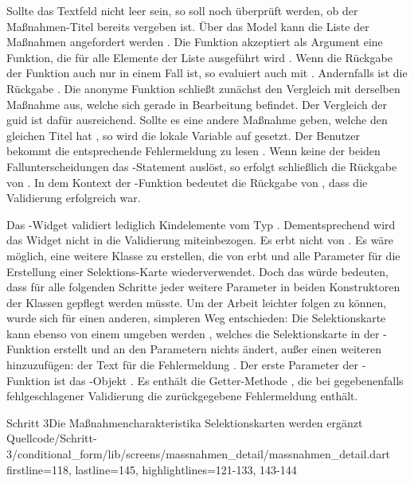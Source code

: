 Sollte das Textfeld nicht leer sein, so soll noch überprüft werden, ob der Maßnahmen-Titel bereits vergeben ist.
Über das Model kann die Liste der Maßnahmen angefordert werden .
Die Funktion  akzeptiert als Argument eine Funktion, die für alle Elemente der Liste ausgeführt wird .
Wenn die Rückgabe der Funktion auch nur in einem Fall  ist, so evaluiert auch  mit .
Andernfalls ist die Rückgabe . 
Die anonyme Funktion schließt zunächst den Vergleich mit derselben Maßnahme aus, welche sich gerade in Bearbeitung befindet.
Der Vergleich der guid ist dafür ausreichend.
Sollte es eine andere Maßnahme geben, welche den gleichen Titel hat , so wird die lokale Variable  auf  gesetzt.
Der Benutzer bekommt die entsprechende Fehlermeldung  zu lesen .
Wenn keine der beiden Fallunterscheidungen das -Statement  auslöst, so erfolgt schließlich die Rückgabe von .
In dem Kontext der -Funktion bedeutet die Rückgabe von  , dass die Validierung erfolgreich war.
 

 
Das -Widget validiert lediglich Kindelemente vom Typ .
Dementsprechend wird das Widget  nicht in die Validierung miteinbezogen.
Es erbt nicht von .
Es wäre möglich, eine weitere Klasse zu erstellen, die von  erbt und alle Parameter für die Erstellung einer Selektions-Karte wiederverwendet.
Doch das würde bedeuten, dass für alle folgenden Schritte jeder weitere Parameter in beiden Konstruktoren der Klassen gepflegt werden müsste.
Um der Arbeit leichter folgen zu können, wurde sich für einen anderen, simpleren Weg entschieden: 
Die Selektionskarte kann ebenso von einem  umgeben werden , welches die Selektionskarte in der -Funktion erstellt und an den Parametern nichts ändert, außer einen weiteren hinzuzufügen: der Text für die Fehlermeldung .
Der erste Parameter der -Funktion ist das -Objekt .
Es enthält die Getter-Methode , die bei gegebenenfalls fehlgeschlagener Validierung die zurückgegebene Fehlermeldung enthält.

\begin{alexlisting}{Schritt 3}{Die Maßnahmencharakteristika Selektionskarten werden ergänzt}
    {Quellcode/Schritt-3/conditional_form/lib/screens/massnahmen_detail/massnahmen_detail.dart}
    {firstline=118, lastline=145, highlightlines={121-133, 143-144}}
    \label{lst:Schritt3buildSelectionCardValidator}
\end{alexlisting}

